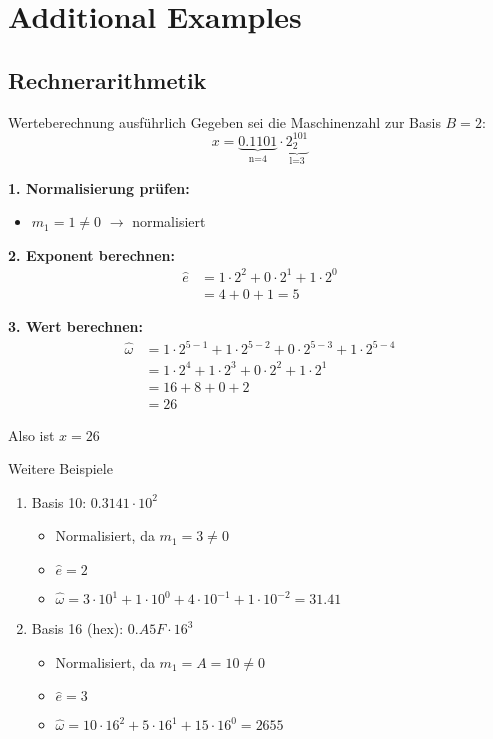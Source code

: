 \section{Additional Examples}

\subsection{Rechnerarithmetik}

\begin{example2}{Werteberechnung ausführlich} 
Gegeben sei die Maschinenzahl zur Basis $B=2$:
$$x = \underbrace{0.1101}_{\text{n=4}} \cdot \underbrace{2^{101}_2}_{\text{l=3}}$$

\textbf{1. Normalisierung prüfen:}
\begin{itemize}
    \item $m_1 = 1 \neq 0$ $\rightarrow$ normalisiert
\end{itemize}

\textbf{2. Exponent berechnen:}
\begin{align*}
\hat{e} &= 1 \cdot 2^2 + 0 \cdot 2^1 + 1 \cdot 2^0 \\
&= 4 + 0 + 1 = 5
\end{align*}

\textbf{3. Wert berechnen:}
\begin{align*}
\hat{\omega} &= 1 \cdot 2^{5-1} + 1 \cdot 2^{5-2} + 0 \cdot 2^{5-3} + 1 \cdot 2^{5-4} \\
&= 1 \cdot 2^4 + 1 \cdot 2^3 + 0 \cdot 2^2 + 1 \cdot 2^1 \\
&= 16 + 8 + 0 + 2 \\
&= 26
\end{align*}

Also ist $x = 26$
\end{example2}

\begin{example2}{Weitere Beispiele}
\begin{enumerate}
    \item Basis 10: $0.3141 \cdot 10^2$
    \begin{itemize}
        \item Normalisiert, da $m_1 = 3 \neq 0$
        \item $\hat{e} = 2$
        \item $\hat{\omega} = 3 \cdot 10^1 + 1 \cdot 10^0 + 4 \cdot 10^{-1} + 1 \cdot 10^{-2} = 31.41$
    \end{itemize}
    
    \item Basis 16 (hex): $0.A5F \cdot 16^3$
    \begin{itemize}
        \item Normalisiert, da $m_1 = A = 10 \neq 0$
        \item $\hat{e} = 3$
        \item $\hat{\omega} = 10 \cdot 16^2 + 5 \cdot 16^1 + 15 \cdot 16^0 = 2655$
    \end{itemize}
\end{enumerate}
\end{example2}


